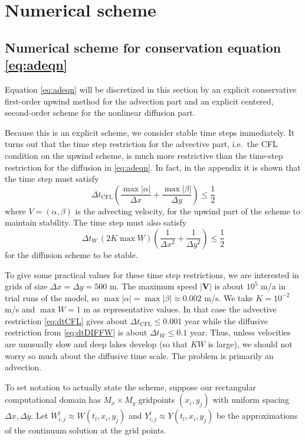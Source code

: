 \documentclass[12pt,final]{amsart}%
\newcommand\bV{\mathbf{V}}
\newcommand{\Wlij}{W^l_{i,j}}
\newcommand{\Ylij}{Y^l_{i,j}}
\begin{document}
\section{Numerical scheme}

\subsection*{Numerical scheme for conservation equation \eqref{eq:adeqn}}  Equation \eqref{eq:adeqn} will be discretized in this section by an explicit conservative first-order upwind method for the advection part and an explicit centered, second-order scheme for the nonlinear diffusion part.

Because this is an explicit scheme, we consider stable time steps immediately.  It turns out that the time step restriction for the advective part, i.e.~the CFL condition on the upwind scheme, is much more restrictive than the time-step restriction for the diffusion in \eqref{eq:adeqn}.  In fact, in the appendix it is shown that the time step must satisfy
\begin{equation}
\Delta t_{\text{CFL}} \left(\frac{\max |\alpha|}{\Delta x} + \frac{\max |\beta|}{\Delta y}\right) \le \frac{1}{2} \label{eq:dtCFL}
\end{equation}
where $V=(\alpha,\beta)$ is the advecting velocity, for the upwind part of the scheme to maintain stability.  The time step must also satisfy
\begin{equation}
\Delta t_W\, (2 K \max W) \left(\frac{1}{\Delta x^2} + \frac{1}{\Delta y^2}\right) \le \frac{1}{2} \label{eq:dtDIFFW}
\end{equation}
for the diffusion scheme to be stable.

To give some practical values for these time step restrictions, we are interested in grids of size $\Delta x = \Delta y = 500$ m.  The maximum speed $|\bV|$ is about $10^5$ m/a in trial runs of the model, so $\max |\alpha| = \max |\beta| \approx 0.002$ m/s.  We take $K=10^{-2}$ m/s and $\max W=1$ m as representative values.  In that case the advective restriction \eqref{eq:dtCFL} gives about $\Delta t_{\text{CFL}} \le 0.001$ year while the diffusive restriction from \eqref{eq:dtDIFFW} is about $\Delta t_W \le 0.1$ year.  Thus, unless velocities are unusually slow and deep lakes develop (so that $KW$ is large), we should not worry so much about the diffusive time scale.  The problem is primarily an advection.

To set notation to actually state the scheme, suppose our rectangular computational domain has $M_x \times M_y$ gridpoints $(x_i,y_j)$ with uniform spacing $\Delta x,\Delta y$.  Let $\Wlij \approx W(t_l,x_i,y_j)$ and $\Ylij \approx Y(t_l,x_i,y_j)$ be the approximations of the continuum solution at the grid points.
\end{document}
